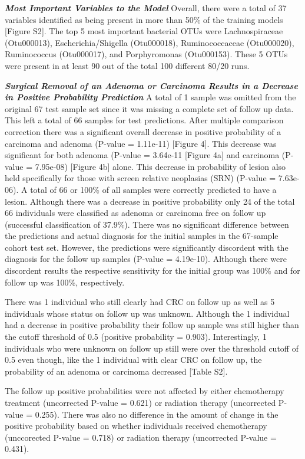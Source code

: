 \documentclass[12pt,]{article}
\begin{document}
\textbf{\emph{Most Important Variables to the Model}} Overall, there
were a total of 37 variables identified as being present in more than
50\% of the training models {[}Figure S2{]}. The top 5 most important
bacterial OTUs were Lachnospiraceae (Otu000013), Escherichia/Shigella
(Otu000018), Ruminococcaceae (Otu000020), Ruminococcus (Otu000017), and
Porphyromonas (Otu000153). These 5 OTUs were present in at least 90 out
of the total 100 different 80/20 runs.

\textbf{\emph{Surgical Removal of an Adenoma or Carcinoma Results in a
Decrease in Positive Probability Prediction}} A total of 1 sample was
omitted from the original 67 test sample set since it was missing a
complete set of follow up data. This left a total of 66 samples for test
predictions. After multiple comparison correction there was a
significant overall decrease in positive probability of a carcinoma and
adenoma (P-value = 1.11e-11) {[}Figure 4{]}. This decrease was
significant for both adenoma (P-value = 3.64e-11 {[}Figure 4a{]} and
carcinoma (P-value = 7.95e-08) {[}Figure 4b{]} alone. This decrease in
probability of lesion also held specifically for those with screen
relative neoplasias (SRN) (P-value = 7.63e-06). A total of 66 or 100\%
of all samples were correctly predicted to have a lesion. Although there
was a decrease in positive probability only 24 of the total 66
individuals were classified as adenoma or carcinoma free on follow up
(successful classification of 37.9\%). There was no significant
difference between the predictions and actual diagnosis for the initial
samples in the 67-sample cohort test set. However, the predictions were
significantly discordent with the diagnosis for the follow up samples
(P-value = 4.19e-10). Although there were discordent results the
respective sensitivity for the initial group was 100\% and for follow up
was 100\%, respectively.

There was 1 individual who still clearly had CRC on follow up as well as
5 individuals whose status on follow up was unknown. Although the 1
individual had a decrease in positive probability their follow up sample
was still higher than the cutoff threshold of 0.5 (positive probability
= 0.903). Interestingly, 1 individuals who were unknown on follow up
still were over the threshold cutoff of 0.5 even though, like the 1
individual with clear CRC on follow up, the probability of an adenoma or
carcinoma decreased {[}Table S2{]}.

The follow up positive probabilities were not affected by either
chemotherapy treatment (uncorrected P-value = 0.621) or radiation
therapy (uncorrected P-value = 0.255). There was also no difference in
the amount of change in the positive probability based on whether
individuals received chemotherapy (unccorected P-value = 0.718) or
radiation therapy (uncorrected P-value = 0.431).
\end{document}
